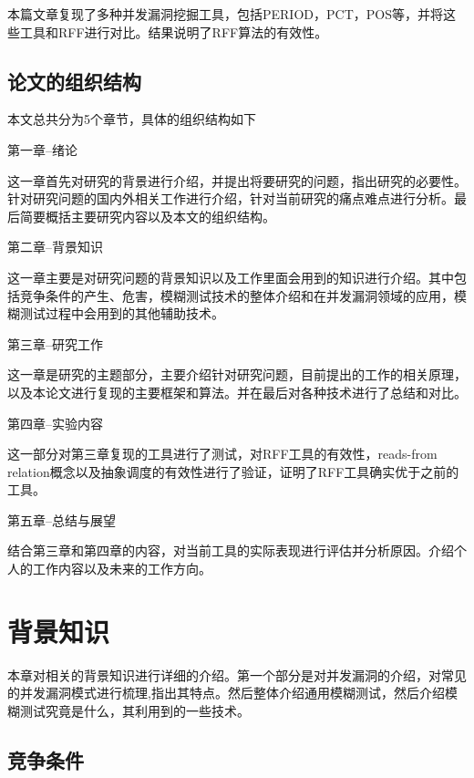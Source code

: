 本篇文章复现了多种并发漏洞挖掘工具，包括PERIOD\cite{wen2022controlled}，PCT\cite{burckhardt2010randomized}，POS\cite{yuan2018partial}等，并将这些工具和RFF进行对比。结果说明了RFF算法的有效性。

\subsection{论文的组织结构}

本文总共分为5个章节，具体的组织结构如下

第一章--绪论\par
这一章首先对研究的背景进行介绍，并提出将要研究的问题，指出研究的必要性。针对研究问题的国内外相关工作进行介绍，针对当前研究的痛点难点进行分析。最后简要概括主要研究内容以及本文的组织结构。\par\par
第二章--背景知识\par
这一章主要是对研究问题的背景知识以及工作里面会用到的知识进行介绍。其中包括竞争条件的产生、危害，模糊测试技术的整体介绍和在并发漏洞领域的应用，模糊测试过程中会用到的其他辅助技术。\par\par
第三章--研究工作\par
这一章是研究的主题部分，主要介绍针对研究问题，目前提出的工作的相关原理，以及本论文进行复现的主要框架和算法。并在最后对各种技术进行了总结和对比。\par\par
第四章--实验内容\par
这一部分对第三章复现的工具进行了测试，对RFF工具的有效性，reads-from relation概念以及抽象调度的有效性进行了验证，证明了RFF工具确实优于之前的工具。\par\par
第五章--总结与展望\par
结合第三章和第四章的内容，对当前工具的实际表现进行评估并分析原因。介绍个人的工作内容以及未来的工作方向。

\section{背景知识}

本章对相关的背景知识进行详细的介绍。第一个部分是对并发漏洞的介绍，对常见的并发漏洞模式进行梳理,指出其特点。然后整体介绍通用模糊测试，然后介绍模糊测试究竟是什么，其利用到的一些技术。

\subsection{竞争条件}

